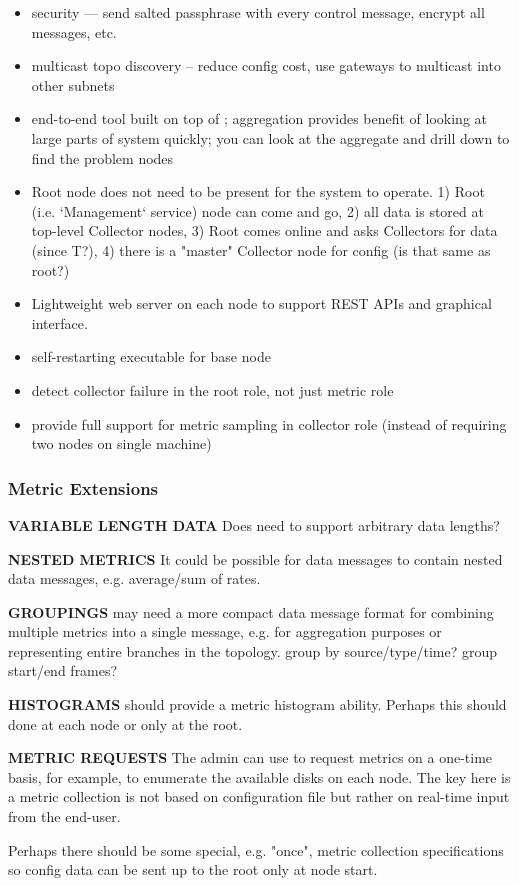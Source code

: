 \begin{itemize}
\item security --- send salted passphrase with every control message, encrypt all messages, etc.

\item multicast topo discovery -- reduce config cost, use gateways to multicast into other subnets

\item end-to-end tool built on top of \dcamp; aggregation provides benefit of looking at large parts of system quickly;
you can look at the aggregate and drill down to find the problem nodes

\item Root node does not need to be present for the system to operate. 1) Root (i.e. `Management` service) node can come
and go, 2) all data is stored at top-level Collector nodes, 3) Root comes online and asks Collectors for data (since
T?), 4) there is a "master" Collector node for config (is that same as root?)

\item Lightweight web server on each node to support REST APIs and graphical interface.

\item self-restarting executable for base node

\item detect collector failure in the root role, not just metric role

\item provide full support for metric sampling in collector role (instead of requiring two nodes on single machine)

\end{itemize}

\subsubsection{Metric Extensions}

\textbf{VARIABLE LENGTH DATA}
Does \dcamp need to support arbitrary data lengths?

\textbf{NESTED METRICS}
It could be possible for data messages to contain nested data messages, e.g. average/sum of rates.

\textbf{GROUPINGS}
\dcamp may need a more compact data message format for combining multiple metrics into a single message, e.g. for
aggregation purposes or representing entire branches in the topology.
group by source/type/time?
group start/end frames?

\textbf{HISTOGRAMS}
\dcamp should provide a metric histogram ability. Perhaps this should done at each node or only at the root.

\textbf{METRIC REQUESTS}
The admin can use \dcamp to request metrics on a one-time basis, for example, to enumerate the available disks on each
node. The key here is a metric collection is not based on configuration file but rather on real-time input from the
end-user.

Perhaps there should be some special, e.g. "once", metric collection specifications so config data can be sent up to the
root only at node start.

